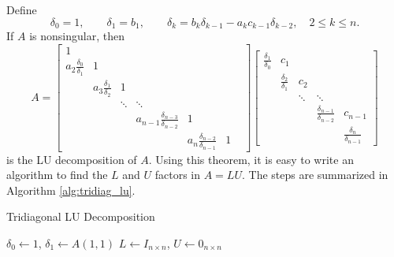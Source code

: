\documentclass{homework}
\begin{document}
\begin{alphaparts}
		Define 
		\begin{equation}
			\delta_0 = 1, \qquad \delta_1 = b_1, \qquad \delta_k = b_k\delta_{k-1} - a_kc_{k-1}\delta_{k-2}, \quad 2 \le k \le n.
		\end{equation}
		If $A$ is nonsingular, then
		\begin{equation}
			A = \left[\begin{matrix}
				1 & & & & & &\\
				a_2\frac{\delta_0}{\delta_1} & 1 & & & & &\\
				  & a_3\frac{\delta_1}{\delta_2} & 1 & & & &\\
				  & & \ddots  & \ddots & & &\\
				  & & & a_{n-1}\frac{\delta_{n-3}}{\delta_{n-2}} & 1 &\\
				  & & & & a_n\frac{\delta_{n-2}}{\delta_{n-1}} & 1
			\end{matrix}\right]\left[\begin{matrix}
				\frac{\delta_1}{\delta_0} & c_1  & & & \\
				& \frac{\delta_2}{\delta_1} & c_2 & &\\
				& & \ddots & \ddots & \\
				& & & \frac{\delta_{n-1}}{\delta_{n-2}} & c_{n-1}\\
				& & & & \frac{\delta_n}{\delta_{n-1}}
			\end{matrix}\right]
		\end{equation}
		is the LU decomposition of $A$. Using this theorem, it is easy to write an algorithm to find the $L$ and $U$ factors in $A = LU$. The steps are summarized in Algorithm \ref{alg:tridiag_lu}.
		
		\begin{algorithm}[h]
			\caption{Tridiagonal LU Decomposition}
			\label{alg:tridiag_lu}
			$\delta_0 \gets 1$, $\delta_1 \gets A(1,1)$\;
			$L \gets I_{n\times n}$, $U \gets 0_{n\times n}$\;
		\end{algorithm}
	\end{alphaparts}
	
\end{document}
